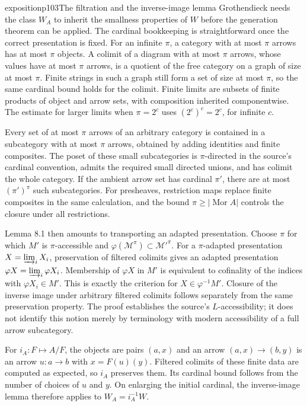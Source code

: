 \begin{dcomment}{exposition}{p103}{The filtration and the inverse-image lemma}
Grothendieck needs the class $W_A$ to inherit the smallness properties of $W$ before the generation theorem can be applied. The cardinal bookkeeping is straightforward once the correct presentation is fixed. For an infinite $\pi$, a category with at most $\pi$ arrows has at most $\pi$ objects. A colimit of a diagram with at most $\pi$ arrows, whose values have at most $\pi$ arrows, is a quotient of the free category on a graph of size at most $\pi$. Finite strings in such a graph still form a set of size at most $\pi$, so the same cardinal bound holds for the colimit. Finite limits are subsets of finite products of object and arrow sets, with composition inherited componentwise. The estimate for larger limits when $\pi=2^c$ uses $(2^c)^c=2^c$, for infinite $c$.

Every set of at most $\pi$ arrows of an arbitrary category is contained in a subcategory with at most $\pi$ arrows, obtained by adding identities and finite composites. The poset of these small subcategories is $\pi$-directed in the source's cardinal convention, admits the required small directed unions, and has colimit the whole category. If the ambient arrow set has cardinal $\pi'$, there are at most $(\pi')^{\pi}$ such subcategories. For presheaves, restriction maps replace finite composites in the same calculation, and the bound $\pi\geq|\operatorname{Mor}A|$ controls the closure under all restrictions.

Lemma 8.1 then amounts to transporting an adapted presentation. Choose $\pi$ for which $M'$ is $\pi$-accessible and $\varphi(\mathcal M^{\pi})\subset\mathcal M'^{\pi}$. For a $\pi$-adapted presentation $X=\varinjlim_iX_i$, preservation of filtered colimits gives an adapted presentation $\varphi X=\varinjlim_i\varphi X_i$. Membership of $\varphi X$ in $M'$ is equivalent to cofinality of the indices with $\varphi X_i\in M'$. This is exactly the criterion for $X\in\varphi^{-1}M'$. Closure of the inverse image under arbitrary filtered colimits follows separately from the same preservation property. The proof establishes the source's $L$-accessibility; it does not identify this notion merely by terminology with modern accessibility of a full arrow subcategory.

For $i_A:F\mapsto A/F$, the objects are pairs $(a,x)$ and an arrow $(a,x)\to(b,y)$ is an arrow $u:a\to b$ with $x=F(u)(y)$. Filtered colimits of these finite data are computed as expected, so $i_A$ preserves them. Its cardinal bound follows from the number of choices of $u$ and $y$. On enlarging the initial cardinal, the inverse-image lemma therefore applies to $W_A=i_A^{-1}W$.
\end{dcomment}

